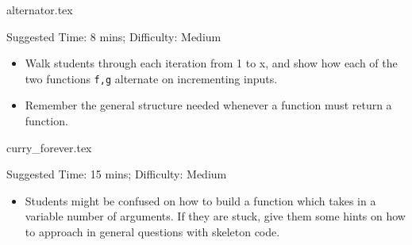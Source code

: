 \documentclass{exam}
\begin{document}
\begin{questions}
    {alternator.tex}
    \begin{questionmeta}
        Suggested Time: 8 mins; Difficulty: Medium
        \begin{itemize}
            \item Walk students through each iteration from 1 to x, and show how each of the two functions \verb|f,g| alternate on incrementing inputs.
            \item Remember the general structure needed whenever a function must return a function.
        \end{itemize}
    \end{questionmeta}

    {curry_forever.tex}
    \begin{questionmeta}
        Suggested Time: 15 mins; Difficulty: Medium
        \begin{itemize}
        \item Students might be confused on how to build a function which takes in a variable number of arguments. If they are stuck, give them some hints on how to approach in general questions with skeleton code.
        \end{itemize}
    \end{questionmeta}
\end{questions}
\end{document}
